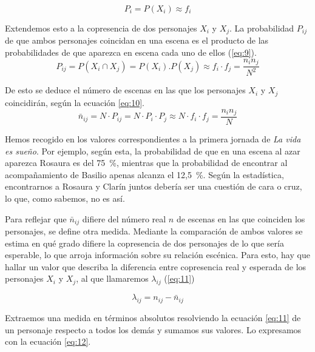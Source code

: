 \begin{equation}\label{eq:8}
	P_i = P(X_i)\approx f_i
\end{equation}

Extendemos esto a la copresencia de dos personajes $X_i$ y $X_j$. La probabilidad $P_{ij}$ de que ambos personajes coincidan en una escena es el producto de las probabilidades de que aparezca en escena cada uno de ellos (\ref{eq:9}).
\begin{equation}\label{eq:9}
	P_{ij} = P(X_i \cap X_j) = P(X_i).P(X_j)\approx f_i\cdot f_j = \frac{n_i n_j}{N^2}
\end{equation}

De esto se deduce el número de escenas en las que los personajes $X_i$ y $X_j$ coincidirán, según la ecuación \ref{eq:10}.
\begin{equation}\label{eq:10}
	\bar{n}_{ij} = N\cdot P_{ij}=N\cdot P_i\cdot P_j \approx N\cdot f_i\cdot f_j = \frac{n_i n_j}{N}
\end{equation}

Hemos recogido en  los valores correspondientes a la primera jornada de \textit{La vida es sueño}. Por ejemplo, según esta, la probabilidad de que en una escena al azar aparezca Rosaura es del 75~\%, mientras que la probabilidad de encontrar al acompañamiento de Basilio apenas alcanza el 12{,}5~\%. Según la estadística, encontrarnos a Rosaura y Clarín juntos debería ser una cuestión de cara o cruz, lo que, como sabemos, no es así. 



Para reflejar que $\bar{n}_{ij}$ difiere del número real $n$ de escenas en las que coinciden los personajes, se define otra medida. Mediante la comparación de ambos valores se estima en qué grado difiere la copresencia de dos personajes de lo que sería esperable, lo que arroja información sobre su relación escénica. Para esto, hay que hallar un valor que describa la  diferencia entre copresencia real y esperada de los personajes $X_i$ y $X_j$, al que llamaremos $\lambda_{ij}$ (\ref{eq:11})

\begin{equation}\label{eq:11}
	\lambda_{ij} = n_{ij} - \bar{n}_{ij}
\end{equation}


Extraemos una medida en términos absolutos resolviendo la ecuación \ref{eq:11} de un personaje respecto a todos los demás y sumamos sus valores. Lo expresamos con la ecuación \ref{eq:12}.

